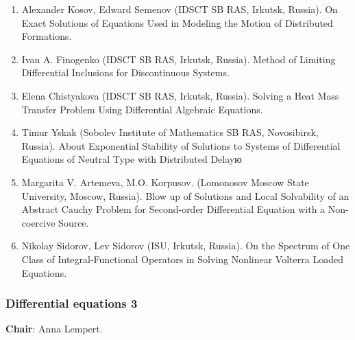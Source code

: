 \documentclass[
]{article}
\providecommand{\tightlist}{%
  \setlength{\itemsep}{0pt}\setlength{\parskip}{0pt}}
\begin{document}
\begin{enumerate}
\def\labelenumi{\arabic{enumi}.}
\tightlist
\item
  Alexander Kosov, Edward Semenov (IDSCT SB RAS, Irkutsk, Russia). On
  Exact Solutions of Equations Used in Modeling the Motion of
  Distributed Formations.
\item
  Ivan A. Finogenko (IDSCT SB RAS, Irkutsk, Russia). Method of Limiting
  Differential Inclusions for Discontinuous Systems.
\item
  Elena Chistyakova (IDSCT SB RAS, Irkutsk, Russia). Solving a Heat Mass
  Transfer Problem Using Differential Algebraic Equations.
\item
  Timur Yskak (Sobolev Institute of Mathematics SB RAS, Novosibirsk,
  Russia). About Exponential Stability of Solutions to Systems of
  Differential Equations of Neutral Type with Distributed Delayю
\item
  Margarita V. Artemeva, M.O. Korpusov. (Lomonosov Moscow State
  University, Moscow, Russia). Blow up of Solutions and Local
  Solvability of an Abstract Cauchy Problem for Second-order
  Differential Equation with a Non-coercive Source.
\item
  Nikolay Sidorov, Lev Sidorov (ISU, Irkutsk, Russia). On the Spectrum
  of One Class of Integral-Functional Operators in Solving Nonlinear
  Volterra Loaded Equations.
\end{enumerate}

\hypertarget{de3}{%
\subsubsection{Differential equations 3}\label{de3}}

\textbf{Chair}: Anna Lempert.
\end{document}
